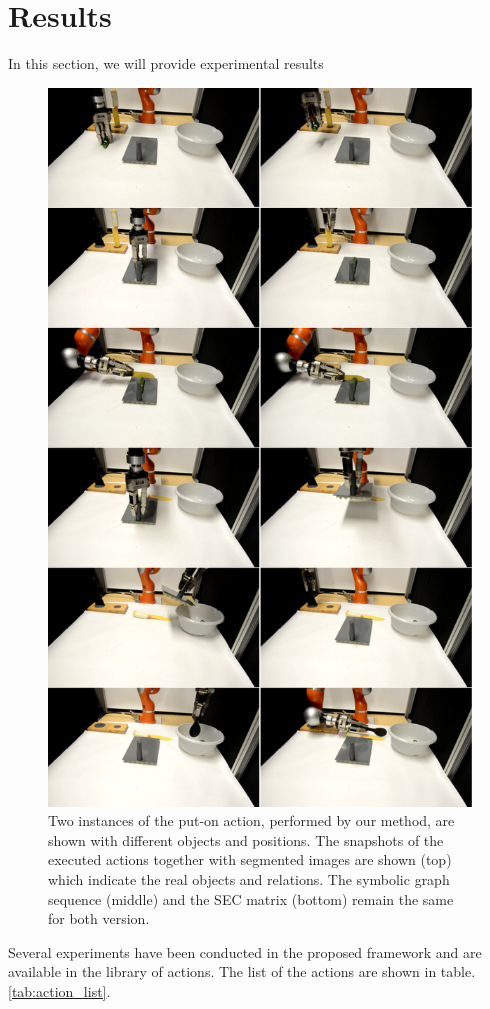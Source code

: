 \section{Results}
\label{sec:results}

In this section, we will provide experimental results 

\begin{figure}
      \centering
      \includegraphics[scale=0.5]{./pdf/scenario_result.pdf}
      \caption{ Two instances of the put-on action, performed by our method, are shown with different objects and positions. 
The snapshots of the executed actions together with segmented images are shown (top) which indicate the real objects and relations.
The symbolic graph sequence (middle) and the SEC matrix (bottom) remain the same for both version.
}
      \label{fig:scenario_result}
\end{figure}
Several experiments have been conducted in the proposed framework and are available in the library of actions.
The list of the actions are shown in table.\ref{tab:action_list}.


